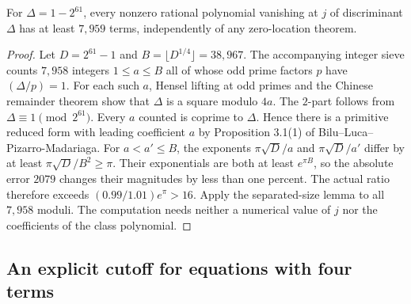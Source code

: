 \begin{corollary}
For $\Delta=1-2^{61}$, every nonzero rational polynomial vanishing at
$j$ of discriminant $\Delta$ has at least $7{,}959$ terms, independently of
any zero-location theorem.
\end{corollary}
\begin{proof}
Let $D=2^{61}-1$ and $B=\lfloor D^{1/4}\rfloor=38{,}967$.
The accompanying integer sieve counts $7{,}958$ integers $1\le a\le B$
all of whose odd prime factors $p$ have $(\Delta/p)=1$.
For each such $a$, Hensel lifting at odd primes and the Chinese remainder
theorem show that $\Delta$ is a square modulo $4a$. The $2$-part follows
from $\Delta\equiv1\pmod{2^{61}}$. Every $a$ counted is coprime to
$\Delta$. Hence there is a primitive reduced form with leading coefficient
$a$ by Proposition 3.1(1) of Bilu--Luca--Pizarro-Madariaga.
For $a<a'\le B$, the exponents $\pi\sqrt D/a$ and $\pi\sqrt D/a'$
differ by at least $\pi\sqrt D/B^2\ge\pi$. Their exponentials are
both at least $e^{\pi B}$, so the absolute error $2079$ changes their
magnitudes by less than one percent. The actual ratio therefore exceeds
$(0.99/1.01)e^\pi>16$. Apply the separated-size lemma to all $7{,}958$
moduli. The computation needs neither a numerical value of $j$ nor the
coefficients of the class polynomial.
\end{proof}

\subsection{An explicit cutoff for equations with four terms}

